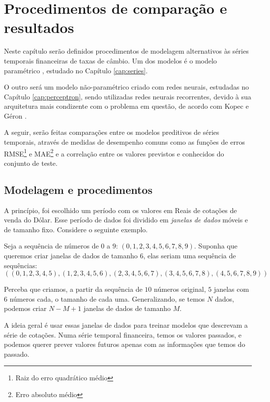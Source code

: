 
\chapter{Procedimentos de comparação e resultados}
\label{cap:comparacao}

Neste capítulo serão definidos procedimentos de modelagem alternativos às séries temporais financeiras de taxas de câmbio. Um dos modelos é o modelo paramétrico , estudado no Capítulo \ref{cap:series}. 

O outro será um modelo não-paramétrico criado com redes neurais, estudadas no Capítulo \ref{cap:perceptron}, sendo utilizadas redes neurais recorrentes, devido à sua arquitetura mais condizente com o problema em questão, de acordo com Kopec \citep{classic} e Géron \citep{hands}.

A seguir, serão feitas comparações entre os modelos preditivos de séries temporais, através de medidas de desempenho comuns como as funções de erros RMSE\footnote{Raiz do erro quadrático médio} e MAE\footnote{Erro absoluto médio} e a correlação entre os valores previstos e conhecidos do conjunto de teste.

\section{Modelagem e procedimentos}

A princípio, foi escolhido um período com os valores em Reais de cotações de venda do Dólar. Esse período de dados foi dividido em \emph{janelas de dados} móveis e de tamanho fixo. Considere o seguinte exemplo. 

Seja a sequência de números de $0$ a $9$: $(0,1,2,3,4,5,6,7,8,9)$. Suponha que queremos criar janelas de dados de tamanho $6$, elas seriam uma sequência de sequências:
\[ ((0,1,2,3,4,5),(1,2,3,4,5,6),(2,3,4,5,6,7),(3,4,5,6,7,8),(4,5,6,7,8,9)) \]

Perceba que criamos, a partir da sequência de $10$ números original, $5$ janelas com $6$ números cada, o tamanho de cada uma. Generalizando, se temos $N$ dados, podemos criar $N{-}M{+}1$ janelas de dados de tamanho $M$.

A ideia geral é usar essas janelas de dados para treinar modelos que descrevam a série de cotações. Numa série temporal financeira, temos os valores passados, e podemos querer prever valores futuros apenas com as informações que temos do passado.

